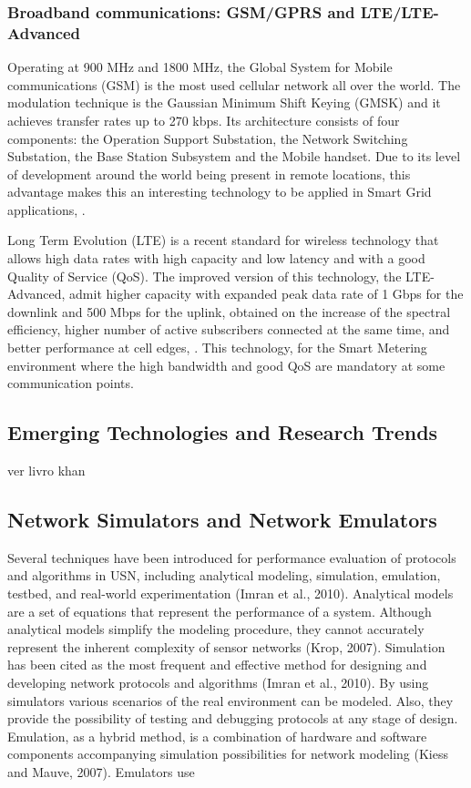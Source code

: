 \subsubsection{Broadband communications: GSM/GPRS and LTE/LTE-Advanced}

Operating at 900 MHz and 1800 MHz, the Global System for Mobile communications (GSM) is the most used cellular network all over the world. The modulation technique is the Gaussian Minimum Shift Keying (GMSK) and it achieves transfer rates up to 270 kbps. Its architecture consists of four components: the Operation Support Substation, the Network Switching Substation, the Base Station Subsystem and the Mobile handset. Due to its level of development around the world being present in remote locations, this advantage makes this  an interesting technology to be applied in Smart Grid applications, \cite{Usman2013}.

Long Term Evolution (LTE) is a recent standard for wireless technology that allows high data rates with high capacity and low latency and with a good Quality of Service (QoS). The improved version of this technology, the LTE-Advanced, admit higher capacity with expanded peak data rate of 1 Gbps for the downlink and 500 Mbps for the uplink, obtained on the increase of the spectral efficiency, higher  number of active subscribers connected at the same time, and better performance at cell edges, \cite{Mohassel2014}. This technology, for the Smart Metering environment where the high bandwidth and good QoS are mandatory at some communication points.




\subsection{Emerging Technologies and Research Trends}

ver livro khan

\subsection{Network Simulators and Network Emulators}

Several techniques have been introduced for performance evaluation of protocols and algorithms in USN, including analytical modeling,
simulation, emulation, testbed, and real-world experimentation (Imran
et al., 2010). Analytical models are a set of equations that represent the
performance of a system. Although analytical models simplify the
modeling procedure, they cannot accurately represent the inherent
complexity of sensor networks (Krop, 2007). Simulation has been cited
as the most frequent and effective method for designing and developing
network protocols and algorithms (Imran et al., 2010). By using
simulators various scenarios of the real environment can be modeled.
Also, they provide the possibility of testing and debugging protocols at
any stage of design. Emulation, as a hybrid method, is a combination of
hardware and software components accompanying simulation possibilities for network modeling (Kiess and Mauve, 2007). Emulators use

